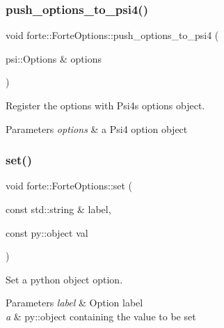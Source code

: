 \subsubsection{\texorpdfstring{push\+\_\+options\+\_\+to\+\_\+psi4()}{push\_options\_to\_psi4()}}
{\footnotesize\ttfamily void forte\+::\+Forte\+Options\+::push\+\_\+options\+\_\+to\+\_\+psi4 (\begin{DoxyParamCaption}\item[{psi\+::\+Options \&}]{options }\end{DoxyParamCaption})}



Register the options with Psi4\textquotesingle{}s options object. 


\begin{DoxyParams}{Parameters}
{\em options} & a Psi4 option object \\
\hline
\end{DoxyParams}
\mbox{\label{classforte_1_1_forte_options_aed9ba828204eb3e0650a79542c1127bf}} 
\subsubsection{\texorpdfstring{set()}{set()}}
{\footnotesize\ttfamily void forte\+::\+Forte\+Options\+::set (\begin{DoxyParamCaption}\item[{const std\+::string \&}]{label,  }\item[{const py\+::object}]{val }\end{DoxyParamCaption})}



Set a python object option. 


\begin{DoxyParams}{Parameters}
{\em label} & Option label \\
\hline
{\em a} & py\+::object containing the value to be set \\
\hline
\end{DoxyParams}
\mbox{\label{classforte_1_1_forte_options_a9290bcf94eb833ede825568bc30208e5}} 

